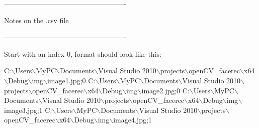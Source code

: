 \begin{DoxyCode}
----------------------------------------------------

    Notes on the .csv file

----------------------------------------------------

Start with an index 0, format should look like \textcolor{keyword}{this}:

C:\(\backslash\)Users\(\backslash\)MyPC\(\backslash\)Documents\(\backslash\)Visual Studio 2010\(\backslash\)projects\(\backslash\)openCV\_facerec\(\backslash\)x64\(\backslash\)Debug\(\backslash\)img\(\backslash\)image1.jpg;0
C:\(\backslash\)Users\(\backslash\)MyPC\(\backslash\)Documents\(\backslash\)Visual Studio 2010\(\backslash\)projects\(\backslash\)openCV\_facerec\(\backslash\)x64\(\backslash\)Debug\(\backslash\)img\(\backslash\)image2.jpg;0
C:\(\backslash\)Users\(\backslash\)MyPC\(\backslash\)Documents\(\backslash\)Visual Studio 2010\(\backslash\)projects\(\backslash\)openCV\_facerec\(\backslash\)x64\(\backslash\)Debug\(\backslash\)img\(\backslash\)image3.jpg;1
C:\(\backslash\)Users\(\backslash\)MyPC\(\backslash\)Documents\(\backslash\)Visual Studio 2010\(\backslash\)projects\(\backslash\)openCV\_facerec\(\backslash\)x64\(\backslash\)Debug\(\backslash\)img\(\backslash\)image4.jpg;1
\end{DoxyCode}
 